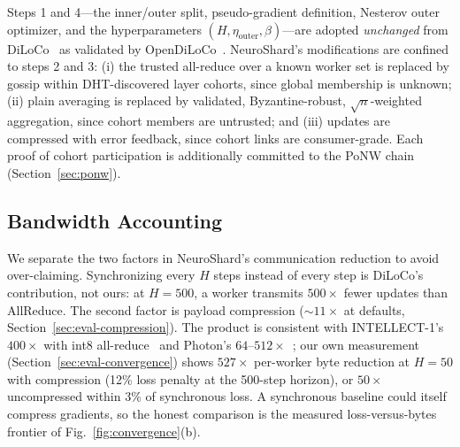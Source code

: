 \documentclass[conference]{IEEEtran}
\begin{document}
Steps 1 and 4---the inner/outer split, pseudo-gradient definition, Nesterov outer optimizer, and the hyperparameters $(H, \eta_{\text{outer}}, \beta)$---are adopted \emph{unchanged} from DiLoCo~\cite{douillard2023diloco} as validated by OpenDiLoCo~\cite{jaghouar2024opendiloco}. NeuroShard's modifications are confined to steps 2 and 3: (i) the trusted all-reduce over a known worker set is replaced by gossip within DHT-discovered layer cohorts, since global membership is unknown; (ii) plain averaging is replaced by validated, Byzantine-robust, $\sqrt{n}$-weighted aggregation, since cohort members are untrusted; and (iii) updates are compressed with error feedback, since cohort links are consumer-grade. Each proof of cohort participation is additionally committed to the PoNW chain (Section~\ref{sec:ponw}).

\subsection{Bandwidth Accounting}
\label{sec:bandwidth}

We separate the two factors in NeuroShard's communication reduction to avoid over-claiming. Synchronizing every $H$ steps instead of every step is DiLoCo's contribution, not ours: at $H{=}500$, a worker transmits $500\times$ fewer updates than AllReduce. The second factor is payload compression (${\sim}11\times$ at defaults, Section~\ref{sec:eval-compression}). The product is consistent with INTELLECT-1's $400\times$ with int8 all-reduce~\cite{jaghouar2024intellect} and Photon's $64$--$512\times$~\cite{sani2024photon}; our own measurement (Section~\ref{sec:eval-convergence}) shows $527\times$ per-worker byte reduction at $H{=}50$ with compression (12\% loss penalty at the 500-step horizon), or $50\times$ uncompressed within 3\% of synchronous loss. A synchronous baseline could itself compress gradients, so the honest comparison is the measured loss-versus-bytes frontier of Fig.~\ref{fig:convergence}(b).
\end{document}
